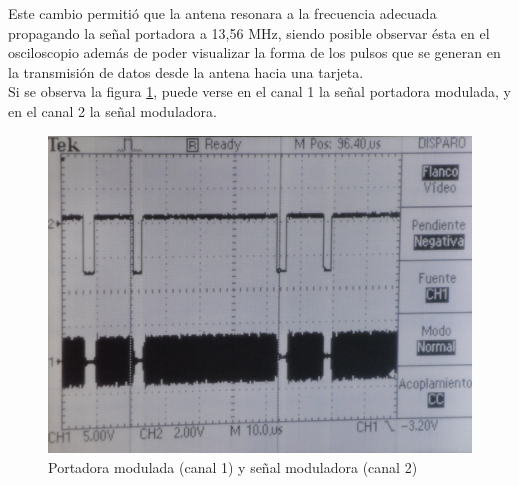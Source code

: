 Este cambio permitió que la antena resonara a la frecuencia adecuada propagando la señal portadora a 13,56 MHz, siendo posible observar ésta en el osciloscopio además de poder visualizar la forma de los pulsos que se generan en la transmisión de datos desde la antena hacia una tarjeta.\\
Si se observa la figura \ref{modul}, puede verse en el canal 1 la señal portadora modulada, y en el canal 2 la señal moduladora.

\begin{figure}[H]
\centering
  \begin{center}
  \includegraphics[scale=.2]{Imagenes/modulada.JPG}
  \end{center}
  \caption{Portadora modulada (canal 1) y señal moduladora (canal 2)}\label{modul} 
\end{figure}

